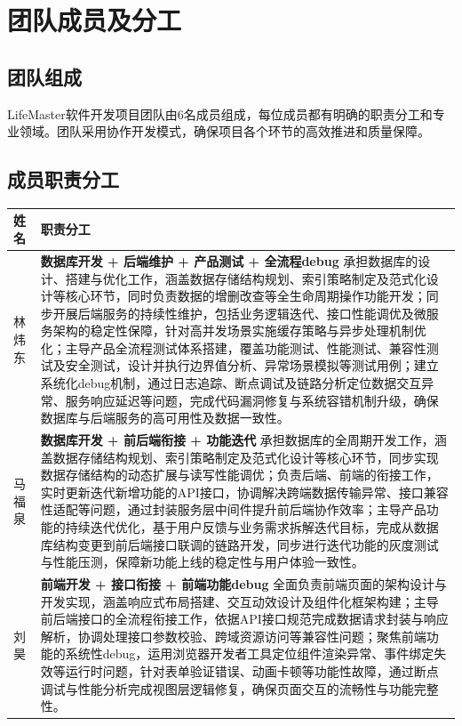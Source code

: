\documentclass[a4paper]{article}
\begin{document}
\section{团队成员及分工}

\subsection{团队组成}

LifeMaster软件开发项目团队由6名成员组成，每位成员都有明确的职责分工和专业领域。团队采用协作开发模式，确保项目各个环节的高效推进和质量保障。

\subsection{成员职责分工}

\begin{longtable}{|p{2.5cm}|p{12cm}|}
\hline
\textbf{姓名} & \textbf{职责分工} \\
\hline
\endhead

林炜东 & \textbf{数据库开发 + 后端维护 + 产品测试 + 全流程debug} \newline
承担数据库的设计、搭建与优化工作，涵盖数据存储结构规划、索引策略制定及范式化设计等核心环节，同时负责数据的增删改查等全生命周期操作功能开发；同步开展后端服务的持续性维护，包括业务逻辑迭代、接口性能调优及微服务架构的稳定性保障，针对高并发场景实施缓存策略与异步处理机制优化；主导产品全流程测试体系搭建，覆盖功能测试、性能测试、兼容性测试及安全测试，设计并执行边界值分析、异常场景模拟等测试用例；建立系统化debug机制，通过日志追踪、断点调试及链路分析定位数据交互异常、服务响应延迟等问题，完成代码漏洞修复与系统容错机制升级，确保数据库与后端服务的高可用性及数据一致性。 \\
\hline

马福泉 & \textbf{数据库开发 + 前后端衔接 + 功能迭代} \newline
承担数据库的全周期开发工作，涵盖数据存储结构规划、索引策略制定及范式化设计等核心环节，同步实现数据存储结构的动态扩展与读写性能调优；负责后端、前端的衔接工作，实时更新迭代新增功能的API接口，协调解决跨端数据传输异常、接口兼容性适配等问题，通过封装服务层中间件提升前后端协作效率；主导产品功能的持续迭代优化，基于用户反馈与业务需求拆解迭代目标，完成从数据库结构变更到前后端接口联调的链路开发，同步进行迭代功能的灰度测试与性能压测，保障新功能上线的稳定性与用户体验一致性。 \\
\hline

刘昊 & \textbf{前端开发 + 接口衔接 + 前端功能debug} \newline
全面负责前端页面的架构设计与开发实现，涵盖响应式布局搭建、交互动效设计及组件化框架构建；主导前后端接口的全流程衔接工作，依据API接口规范完成数据请求封装与响应解析，协调处理接口参数校验、跨域资源访问等兼容性问题；聚焦前端功能的系统性debug，运用浏览器开发者工具定位组件渲染异常、事件绑定失效等运行时问题，针对表单验证错误、动画卡顿等功能性故障，通过断点调试与性能分析完成视图层逻辑修复，确保页面交互的流畅性与功能完整性。 \\
\hline


\end{longtable}
\end{document}
